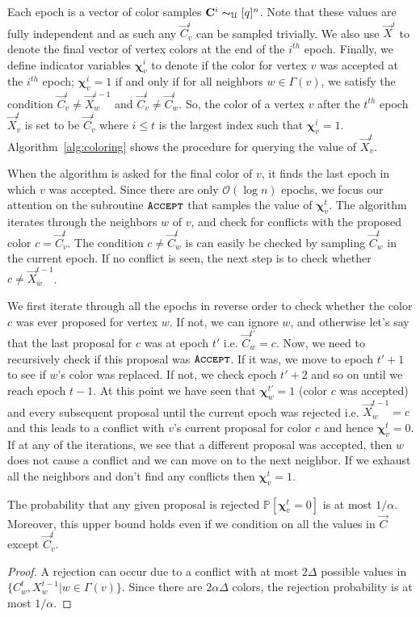 Each epoch is a vector of color samples $\vec C^{i} \thicksim_{\mathcal U} [q]^n$.
Note that these values are fully independent and as such any $\vec C^i_v$ can be sampled trivially.
We also use $\vec X^i$ to denote the final vector of vertex colors at the end of the $i^{th}$ epoch.
Finally, we define indicator variables $\bm \chi^i_v$ to denote if the color for vertex $v$ was accepted at the $i^{th}$ epoch;
$\bm \chi^i_v = 1$ if and only if for all neighbors $w\in \Gamma(v)$,
we satisfy the condition $\vec  C^i_v\not= \vec X^{i-1}_w$ and $\vec C^i_v\not= \vec C^i_w$.
So, the color of a vertex $v$ after the $t^{th}$ epoch $\vec X^t_v$ is set to be $\vec C^i_v$
where $i\le t$ is the largest index such that $\bm \chi^i_v=1$.
Algorithm~\ref{alg:coloring} shows the procedure for querying the value of $\vec X^t_v$.

When the algorithm is asked for the final color of $v$, it finds the last epoch in which $v$ was accepted.
Since there are only $\mathcal O(\log n)$ epochs, we focus our attention on the subroutine $\func{Accept}$ that samples the value of $\bm\chi^t_v$.
The algorithm iterates through the neighbors $w$ of $v$, and check for conflicts with the proposed color $c=\vec C^t_v$.
The condition $c\not= \vec C^t_w$ is can easily be checked by sampling $\vec C^t_w$ in the current epoch.
If no conflict is seen, the next step is to check whether $c\not= \vec X^{t-1}_w$.

We first iterate through all the epochs in reverse order to check whether the color $c$ was ever proposed for vertex $w$.
If not, we can ignore $w$, and otherwise let's say that the last proposal for $c$ was at epoch $t'$ i.e. $\vec C^{t'}_w = c$.
Now, we need to recursively check if this proposal was $\func{Accept}$.
If it was, we move to epoch $t'+1$ to see if $w$'s color was replaced.
If not, we check epoch $t'+2$ and so on until we reach epoch $t-1$.
At this point we have seen that $\bm\chi^{t'}_w = 1$ (color $c$ was accepted) and every subsequent proposal until the current epoch was rejected
i.e. $\vec X^{t-1}_w = c$ and this leads to a conflict with $v$'s current proposal for color $c$ and hence $\bm\chi^t_v = 0$.
If at any of the iterations, we see that a different proposal was accepted, then $w$ does not cause a conflict and we can move on to the next neighbor.
If we exhaust all the neighbors and don't find any conflicts then $\bm\chi^t_v = 1$.

\begin{lemma}
\label{lem:color_reject_probability}
The probability that any given proposal is rejected $\mathbb P[\bm\chi^t_v=0]$ is at most $1/\alpha$.
Moreover, this upper bound holds even if we condition on all the values in $\vec C$ except $\vec C^t_v$.
\end{lemma}
\begin{proof}
A rejection can occur due to a conflict with at most $2\Delta$ possible values in $\{ C^t_w, X^{t-1}_w | w\in\Gamma(v)\}$.
Since there are $2\alpha\Delta$ colors, the rejection probability is at most $1/\alpha$.
\end{proof}

